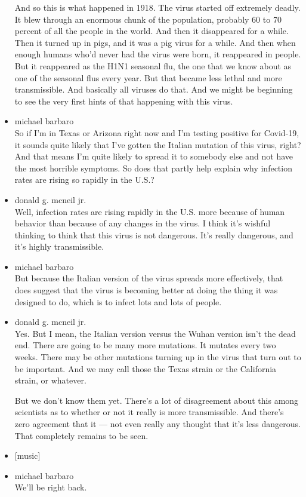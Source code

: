 \begin{itemize}
  And so this is what happened in 1918. The virus started off extremely
  deadly. It blew through an enormous chunk of the population, probably
  60 to 70 percent of all the people in the world. And then it
  disappeared for a while. Then it turned up in pigs, and it was a pig
  virus for a while. And then when enough humans who'd never had the
  virus were born, it reappeared in people. But it reappeared as the
  H1N1 seasonal flu, the one that we know about as one of the seasonal
  flus every year. But that became less lethal and more transmissible.
  And basically all viruses do that. And we might be beginning to see
  the very first hints of that happening with this virus.
\item
  michael barbaro\\
  So if I'm in Texas or Arizona right now and I'm testing positive for
  Covid-19, it sounds quite likely that I've gotten the Italian mutation
  of this virus, right? And that means I'm quite likely to spread it to
  somebody else and not have the most horrible symptoms. So does that
  partly help explain why infection rates are rising so rapidly in the
  U.S.?
\item
  donald g. mcneil jr.\\
  Well, infection rates are rising rapidly in the U.S. more because of
  human behavior than because of any changes in the virus. I think it's
  wishful thinking to think that this virus is not dangerous. It's
  really dangerous, and it's highly transmissible.
\item
  michael barbaro\\
  But because the Italian version of the virus spreads more effectively,
  that does suggest that the virus is becoming better at doing the thing
  it was designed to do, which is to infect lots and lots of people.
\item
  donald g. mcneil jr.\\
  Yes. But I mean, the Italian version versus the Wuhan version isn't
  the dead end. There are going to be many more mutations. It mutates
  every two weeks. There may be other mutations turning up in the virus
  that turn out to be important. And we may call those the Texas strain
  or the California strain, or whatever.

  But we don't know them yet. There's a lot of disagreement about this
  among scientists as to whether or not it really is more transmissible.
  And there's zero agreement that it --- not even really any thought
  that it's less dangerous. That completely remains to be seen.
\item
  {[}music{]}
\item
  michael barbaro\\
  We'll be right back.


\end{itemize}
